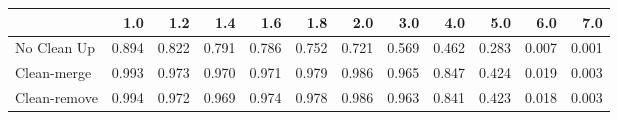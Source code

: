 \begin{tabular}{lrrrrrrrrrrr}
\toprule
{} &   1.0 &   1.2 &   1.4 &   1.6 &   1.8 &   2.0 &   3.0 &   4.0 &   5.0 &   6.0 &   7.0 \\
\midrule
No Clean Up  & 0.894 & 0.822 & 0.791 & 0.786 & 0.752 & 0.721 & 0.569 & 0.462 & 0.283 & 0.007 & 0.001 \\
Clean-merge  & 0.993 & 0.973 & 0.970 & 0.971 & 0.979 & 0.986 & 0.965 & 0.847 & 0.424 & 0.019 & 0.003 \\
Clean-remove & 0.994 & 0.972 & 0.969 & 0.974 & 0.978 & 0.986 & 0.963 & 0.841 & 0.423 & 0.018 & 0.003 \\
\bottomrule
\end{tabular}
